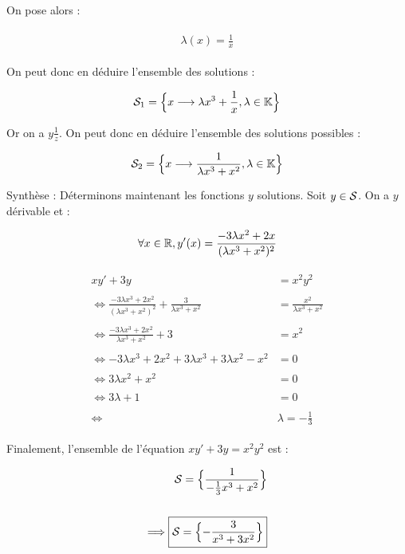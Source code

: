 \documentclass{article}
\begin{document}
On pose alors :

\begin{align*}\begin{split}
\lambda(x)=\frac{1}{x}
\end{split}\end{align*}

On peut donc en déduire l'ensemble des solutions :

\begin{align*}\begin{split}
\mathcal{S}_1=\Bigl\{x\longrightarrow\lambda x^3+\frac{1}{x}, \lambda\in\mathbb{K}\Bigl\}
\end{split}\end{align*}

Or on a $y\frac{1}{z}$. On peut donc en déduire l'ensemble des solutions possibles :

\begin{align*}\begin{split}
\mathcal{S}_2=\Bigl\{x\longrightarrow\frac{1}{\lambda x^3+x^2},\lambda\in\mathbb{K}\Bigl\}
\end{split}\end{align*}

\bigskip
\bigskip
\bigskip

Synthèse : Déterminons maintenant les fonctions $y$ solutions. Soit $y\in\mathcal{S}$. On a $y$ dérivable et :

\begin{align*}\begin{split}
\forall x\in\mathbb{R}, y'(x)=\frac{-3\lambda x^2+2x}{(\lambda x^3+x^2)^2}
\end{split}\end{align*}

\begin{align*}\begin{split}
xy'+3y&=x^2y^2\\\\
\Longleftrightarrow \frac{-3\lambda x^3 + 2x^2}{(\lambda x^3+x^2)^2}+\frac{3}{\lambda x^3+x^2}&=\frac{x^2}{\lambda x^3+x^2}\\\\
\Longleftrightarrow \frac{-3\lambda x^3 + 2x^2}{\lambda x^3+x^2}+3&=x^2\\\\
\Longleftrightarrow -3\lambda x^3 + 2x^2 +3\lambda x^3 + 3\lambda x^2 - x^2&=0\\\\
\Longleftrightarrow 3\lambda x^2+x^2 &= 0\\\\
\Longleftrightarrow 3\lambda + 1 &= 0\\\\
\Longleftrightarrow& \boxed{\lambda = -\frac{1}{3}}
\end{split}\end{align*}

Finalement, l'ensemble de l'équation $xy'+3y=x^2y^2$ est :

\begin{align*}\begin{split}
\mathcal{S}=\Bigl\{\frac{1}{-\frac{1}{3}x^3+x^2}\Bigl\}\\\\
\Longrightarrow \boxed{\mathcal{S}=\Bigl\{-\frac{3}{x^3+3x^2}\Bigl\}}
\end{split}\end{align*}
\end{document}
